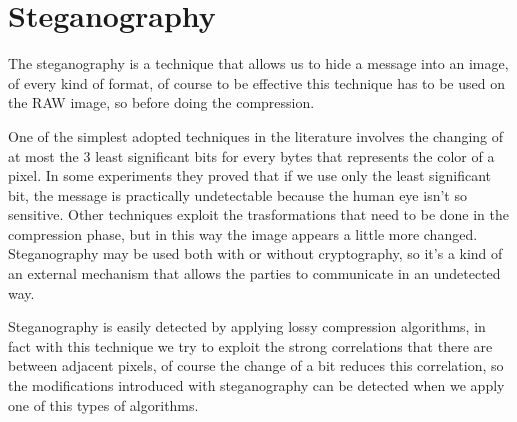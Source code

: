 \chapter{Steganography}

The steganography is a technique that allows us to hide a message into an image, of every kind of format, of course to be effective this technique has to be used on the RAW image, so before doing the compression. 

One of the simplest adopted techniques in the literature involves the changing of at most the 3 least significant bits for every bytes that represents the color of a pixel.  
In some experiments they proved that if we use only the least significant bit, the message is practically undetectable because the human eye isn't so sensitive. 
Other techniques exploit the trasformations that need to be done in the compression phase, but in this way the image appears a little more changed.
Steganography may be used both with or without cryptography, so it's a kind of an external mechanism that allows the parties to communicate in an undetected way. 

Steganography is easily detected by applying lossy compression algorithms, in fact with this technique we try to exploit the strong correlations that there are between adjacent pixels, of course the change of a bit reduces this correlation, so the modifications introduced with steganography can be detected when we apply one of this types of algorithms.  